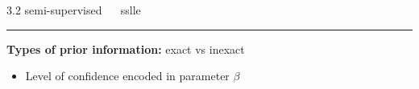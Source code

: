\documentclass[11pt, compress, t, notes = noshow, xcolor = table, 
aspectratio = 1610]{beamer}
\newcommand{\highlight}[1]{\textcolor{highlightcol}{\textbf{#1}}}
\newcommand{\arritem}{\item[\highlight{$\rightarrow$}]}
\newcommand{\Y}{\mathcal{Y}}
\newcommand{\E}{\bm{E}}
\newcommand{\I}{\bm{I}}
\begin{document}

\LARGE
\begin{frame}{\textcolor{gray!90}{3.2 semi-supervised} ~~ sslle}
\normalsize
\vspace{-0.5cm}
\noindent \textcolor{gray!90}{\rule{\textwidth}{1pt}}
\smallskip

% 
% 

% 
% 
% 
% 
% 


\textbf{Types of prior information:} exact vs inexact
\begin{itemize}
  \arritem Level of confidence encoded in parameter $\beta$
\end{itemize}


\end{frame}
\end{document}
